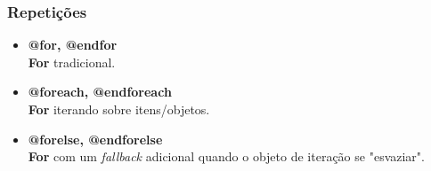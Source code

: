 \documentclass[
12pt,				%
openany,			%
twoside,			%
a4paper,			%
english,			%
french,				%
spanish,			%
brazil,				%
]{abntex2}
\begin{document}
\subsubsection{Repetições}
\begin{itemize}
    \item \textbf{@for, @endfor} \\
        \textbf{For} tradicional.

    \item \textbf{@foreach, @endforeach} \\
        \textbf{For} iterando sobre itens/objetos.

    \item \textbf{@forelse, @endforelse} \\
        \textbf{For} com um \textit{fallback} adicional quando o objeto de iteração se "esvaziar".
\end{itemize}
\end{document}
